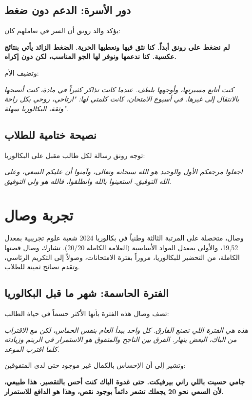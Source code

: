 \documentclass[12pt,a4paper]{book}
\newcommand{\quoteAr}[1]{%
	\begin{myquote}
		\itshape #1
	\end{myquote}
}
\newcommand{\importantAr}[1]{%
	\begin{important}
		\bfseries #1
	\end{important}
}
\begin{document}
	\subsection{دور الأسرة: الدعم دون ضغط}
	يؤكد والد رونق أن السر في تعاملهم كان:
	\importantAr{لم نضغط على رونق أبداً. كنا نثق فيها ونعطيها الحرية. الضغط الزائد يأتي بنتائج عكسية. كنا ندعمها ونوفر لها الجو المناسب، لكن دون إكراه.}
	وتضيف الأم: \quoteAr{كنت أتابع مسيرتها، وأوجهها بلطف. عندما كانت تذاكر كثيراً في مادة، كنت أنصحها بالانتقال إلى غيرها. في أسبوع الامتحان، كانت كلمتي لها: "ارتاحي، روحي بكل راحة وثقة، البكالوريا سهلة".}
	
	\subsection{نصيحة ختامية للطلاب}
	توجه رونق رسالة لكل طالب مقبل على البكالوريا:
	\quoteAr{اجعلوا مرجعكم الأول والوحيد هو الله سبحانه وتعالى، وآمنوا أن عليكم السعي، وعلى الله التوفيق. استعينوا بالله وانطلقوا، فالله هو ولي التوفيق.}
	
	\section{تجربة وصال}
	
	وصال، متحصلة على المرتبة الثالثة وطنياً في بكالوريا 2024 شعبة علوم تجريبية بمعدل 19,52، والأولى بمعدل المواد الأساسية (العلامة الكاملة 20/20). تشارك وصال قصتها الكاملة، من التحضير للبكالوريا، مروراً بفترة الامتحانات، وصولاً إلى التكريم الرئاسي، وتقدم نصائح ثمينة للطلاب.
	
	\subsection{الفترة الحاسمة: شهر ما قبل البكالوريا}
			\label{sec:after-exams-reorganization2}
	
	تصف وصال هذه الفترة بأنها الأكثر حسماً في حياة الطالب:
	
	\quoteAr{هذه هي الفترة اللي تصنع الفارق. كل واحد يبدأ العام بنفس الحماس، لكن مع الاقتراب من الباك، البعض ينهار. الفرق بين الناجح والمتفوق هو الاستمرار في الريتم وزيادته كلما اقترب الموعد.}
	
	وتشير إلى أن الإحساس بالكمال غير موجود حتى لدى المتفوقين:
	
	\importantAr{جامي حسيت باللي راني بيرفيكت. حتى غدوة الباك كنت أحس بالتقصير. هذا طبيعي، لأن السعي نحو 20 يجعلك تشعر دائماً بوجود نقص، وهذا هو الدافع للاستمرار.}
	
\end{document}
